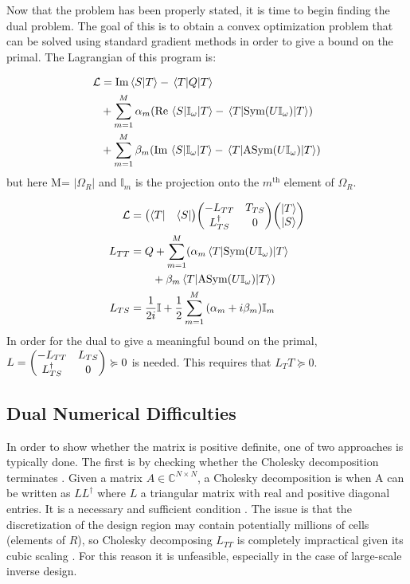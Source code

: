 \documentclass[twocolumn]{revtex4-2}
\begin{document}
 Now that the problem has been properly stated, it is time to begin finding the dual problem. The goal of this is to obtain a convex optimization problem that can be solved using standard gradient methods in order to give a bound on the primal. The Lagrangian of this program is:

 \begin{align}
	\mathcal{L} &= \Im\braket{S}{T} - \ev{Q}{T}\\
	&+ \sum_{m=1}^M \alpha_m\qty(\Re\mel{S}{\mathbb{I}_\omega}{T} - \ev{\text{Sym}\qty(U\mathbb{I}_\omega)}{T})\nonumber\\
	&+ \sum_{m=1}^M \beta_m\qty(\Im\mel{S}{\mathbb{I}_\omega}{T} - \ev{\text{ASym}\qty(U\mathbb{I}_\omega)}{T})\nonumber
 \end{align}
but here M= $|\Omega_R|$ and $\mathbb{I}_m$  is the projection onto the $m^\text{th}$ element of $\Omega_R$.

\begin{align}
	\mathcal{L} &= \mqty(\bra{T} & \bra{S})\mqty(-L_{TT} & T_{TS} \\ L_{TS}^\dagger & 0)\mqty(\ket{T} \\ \ket{S})\\
	L_{TT} &=  Q + \sum_{m=1}^M (\alpha_m\ev{\text{Sym}\qty(U\mathbb{I}_\omega)}{T}\nonumber\\
	&\qquad +\beta_m\ev{\text{ASym}\qty(U\mathbb{I}_\omega)}{T})\nonumber\\
	L_{TS} &=  \frac{1}{2i}\mathbb{I} + \frac{1}{2}\sum_{m=1}^M \qty(\alpha_m + i\beta_m)\mathbb{I}_m\nonumber
\end{align}
In order for the dual to give a meaningful bound on the primal, $L=\mqty(-L_{TT} & L_{TS}\\ L_{TS}^\dagger & 0)\succcurlyeq 0$ is needed. This requires that $L_TT\succcurlyeq 0$.

\subsection{Dual Numerical Difficulties}
\label{sec:dual_numerical_difficulties}
In order to show whether the matrix is positive definite, one of two approaches is typically done. The first is by checking whether the Cholesky decomposition terminates \cite{roux2016formal, rump2006verification}. Given a matrix $A\in\mathbb{C}^{N\times N}$, a Cholesky decomposition is when A can be written as $LL^\dagger$  where $L$ a triangular matrix with real and positive diagonal entries.  It is a necessary and sufficient condition \cite{schnabel1990new}. The issue is that the discretization of the design region may contain potentially millions of cells (elements of $R$), so Cholesky decomposing $L_{TT}$ is completely impractical given its cubic scaling \cite{trefethen2022numerical}. For this reason it is unfeasible, especially in the case of large-scale inverse design.
\end{document}
